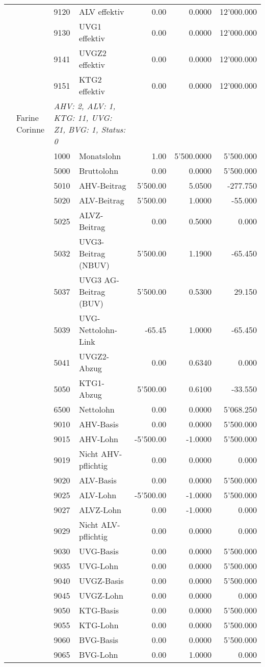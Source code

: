\documentclass[15pt,a4paper]{article}
\begin{document}
\begin{longtable}{@{\extracolsep{\fill}}l l l l|r|r|r}
&&9120&ALV effektiv&0.00&0.0000&12'000.000\\
&&9130&UVG1 effektiv&0.00&0.0000&12'000.000\\
&&9141&UVGZ2 effektiv&0.00&0.0000&12'000.000\\
&&9151&KTG2 effektiv&0.00&0.0000&12'000.000\\
\pagebreak
9&Farine Corinne&\multicolumn{2}{l|}{\small\emph{AHV: 2, ALV: 1, KTG: 11, UVG: Z1, BVG: 1, Status: 0}}&& \\
&&1000&Monatslohn&1.00&5'500.0000&5'500.000\\
&&5000&Bruttolohn&0.00&0.0000&5'500.000\\
&&5010&AHV-Beitrag&5'500.00&5.0500&-277.750\\
&&5020&ALV-Beitrag&5'500.00&1.0000&-55.000\\
&&5025&ALVZ-Beitrag&0.00&0.5000&0.000\\
&&5032&UVG3-Beitrag (NBUV)&5'500.00&1.1900&-65.450\\
&&5037&UVG3 AG-Beitrag (BUV)&5'500.00&0.5300&29.150\\
&&5039&UVG-Nettolohn-Link&-65.45&1.0000&-65.450\\
&&5041&UVGZ2-Abzug&0.00&0.6340&0.000\\
&&5050&KTG1-Abzug&5'500.00&0.6100&-33.550\\
&&6500&Nettolohn&0.00&0.0000&5'068.250\\
&&9010&AHV-Basis&0.00&0.0000&5'500.000\\
&&9015&AHV-Lohn&-5'500.00&-1.0000&5'500.000\\
&&9019&Nicht AHV-pflichtig&0.00&0.0000&0.000\\
&&9020&ALV-Basis&0.00&0.0000&5'500.000\\
&&9025&ALV-Lohn&-5'500.00&-1.0000&5'500.000\\
&&9027&ALVZ-Lohn&0.00&-1.0000&0.000\\
&&9029&Nicht ALV-pflichtig&0.00&0.0000&0.000\\
&&9030&UVG-Basis&0.00&0.0000&5'500.000\\
&&9035&UVG-Lohn&0.00&0.0000&5'500.000\\
&&9040&UVGZ-Basis&0.00&0.0000&5'500.000\\
&&9045&UVGZ-Lohn&0.00&0.0000&0.000\\
&&9050&KTG-Basis&0.00&0.0000&5'500.000\\
&&9055&KTG-Lohn&0.00&0.0000&5'500.000\\
&&9060&BVG-Basis&0.00&0.0000&5'500.000\\
&&9065&BVG-Lohn&0.00&1.0000&0.000\\

\end{longtable}
\end{document}
